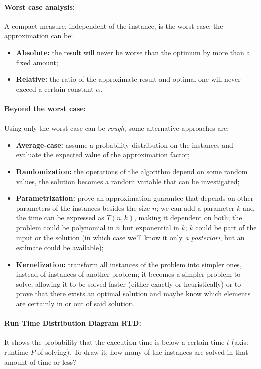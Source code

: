 \documentclass{article}
\begin{document}
	\paragraph{Worst case analysis:} A compact measure, independent of the instance, is the worst case; the approximation can be: 
	\begin{itemize}
		\item \textbf{Absolute:} the result will never be worse than the optimum by more than a fixed amount;
		\item\textbf{Relative:} the ratio of the approximate result and optimal one will never exceed a certain constant $\alpha$.\\
	\end{itemize}
	
	\paragraph{Beyond the worst case:} Using only the worst case can be \textit{rough}, some alternative approaches are: 
	\begin{itemize}
		\item \textbf{Average-case:} assume a probability distribution on the instances and evaluate the expected value of the approximation factor;
		\item \textbf{Randomization:} the operations of the algorithm depend on some random values, the solution becomes a random variable that can be investigated;
		\item \textbf{Parametrization:} prove an approximation guarantee that depends on other parameters of the instances besides the size $n$; we can add a parameter $k$ and the time can be expressed as $T(n,k)$, making it dependent on both; the problem could be polynomial in $n$ but exponential in $k$; $k$ could be part of the input or the solution (in which case we'll know it only \textit{a posteriori}, but an estimate could be available); 
		\item \textbf{Kernelization:} transform all instances of the problem into simpler ones, instead of instances of another problem; it becomes a simpler problem to solve, allowing it to be solved faster (either exactly or heuristically) or to prove that there exists an optimal solution  and maybe know which elements are certainly in or out of said solution.\\
	\end{itemize}
	
	\paragraph{Run Time Distribution Diagram RTD:} It shows the probability that the execution time is below a certain time $t$ (axis: runtime-$P$ of solving). To draw it: how many of the instances are solved in that amount of time or less?\\
	
\end{document}
